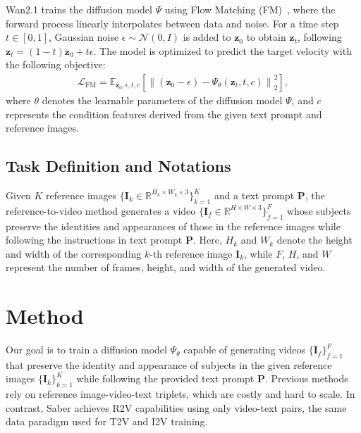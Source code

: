 %
Wan2.1 trains the diffusion model $\Psi$ using Flow Matching (FM)~\citep{lipman2022flow}, where the forward process linearly interpolates between data and noise.
For a time step $t \in [0, 1]$, Gaussian noise $\epsilon \sim \mathcal{N}(0, I)$ is added to $\mathbf{z}_{0}$ to obtain $\mathbf{z}_{t}$, following $\mathbf{z}_{t} = (1 - t) \mathbf{z}_{0} + t \epsilon$.
The model is optimized to predict the target velocity with the following objective:
\begin{align}
\label{eq:loss}
    \mathcal{L}_\text{FM} = \mathbb{E}_{\mathbf{z}_{0}, \epsilon, t, c} \left[\left\|(\mathbf{z}_{0} - \epsilon)  - \Psi_\theta ( \mathbf{z}_{t}, t, c)\right\|_{2}^{2} \right],
\end{align}
where $\theta$ denotes the learnable parameters of the diffusion model $\Psi$, and $c$ represents the condition features derived from the given text prompt and reference images.

\subsection{Task Definition and Notations}
\label{saber:sec:task_define}
Given $K$ reference images $\{ \mathbf{I}_{k} \in \mathbb{R}^{H_{k} \times W_{k} \times 3}\}_{k=1}^{K}$ and a text prompt $\mathbf{P}$, the reference-to-video method generates a video $\{ \mathbf{I}_{f} \in \mathbb{R}^{H \times W \times 3} \}_{f=1}^{F}$ whose subjects preserve the identities and appearances of those in the reference images while following the instructions in text prompt $\mathbf{P}$.
Here, $H_{k}$ and $W_{k}$ denote the height and width of the corresponding $k$-th reference image $\mathbf{I}_{k}$, while $F$, $H$, and $W$ represent the number of frames, height, and width of the generated video.


\section{Method}
\label{saber:sec:method}

Our goal is to train a diffusion model $\Psi_\theta$ capable of generating videos $\{ \mathbf{I}_{f} \}_{f=1}^{F}$ that preserve the identity and appearance of subjects in the given reference images $\{ \mathbf{I}_{k} \}_{k=1}^{K}$ while following the provided text prompt $\mathbf{P}$. 
Previous methods~\citep{liu2025phantom, jiang2025vace, hu2025hunyuancustom, hu2025polyvivid, li2025bindweave} rely on reference image-video-text triplets, which are costly and hard to scale.
In contrast, Saber achieves R2V capabilities using only video-text pairs, the same data paradigm used for T2V and I2V training.

